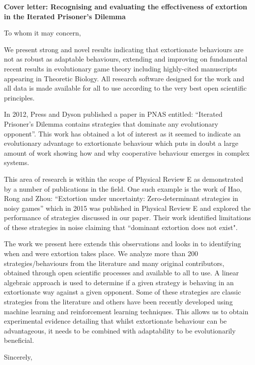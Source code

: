 \documentclass[11pt]{letter}
\begin{document}
\signature{The authors}

\begin{letter}{}

\textbf{Cover letter: Recognising and evaluating the effectiveness
       of extortion in the Iterated Prisoner's Dilemma}

To whom it may concern,

We present strong and novel results indicating that extortionate behaviours are
not as robust as adaptable behaviours, extending and improving on fundamental
recent results in evolutionary game theory including highly-cited manuscripts
appearing in Theoretic Biology. All research software designed for the work
and all data is made available for all to use according to the very best open
scientific principles.

In 2012, Press and Dyson published a paper in PNAS entitled: ``Iterated
Prisoner’s Dilemma contains strategies that dominate any evolutionary
opponent''. This work has obtained a lot of interest as it seemed to indicate an
evolutionary advantage to extortionate behaviour which puts in doubt a
large amount of work showing how and why cooperative behaviour emerges in
complex systems.

This area of research is within the scope of Physical Review E as
demonstrated by a number of publications in the field. One such example is the work
of Hao, Rong and Zhou: ``Extortion under uncertainty: Zero-determinant
strategies in noisy games'' which in 2015 was published in
Physical Review E and explored the performance of strategies discussed in our
paper. Their work identified limitations of these strategies in noise claiming
that ``dominant extortion does not exist".

The work we present here extends this observations and looks in to identifying
when and were extortion takes place.
We analyze more than 200 strategies/behaviours from the literature and
many original contributors, obtained through open scientific processes and
available to all to use. A linear algebraic approach is used to determine if a
given strategy is behaving in an extortionate way against a given opponent. Some
of these strategies are classic strategies from the literature and others have
been recently developed using machine learning and reinforcement learning
techniques. This allows us to obtain experimental evidence detailing that whilst
extortionate behaviour can be advantageous, it needs to be combined with
adaptability to be evolutionarily beneficial.

\closing{Sincerely,}

\end{letter}
\end{document}
